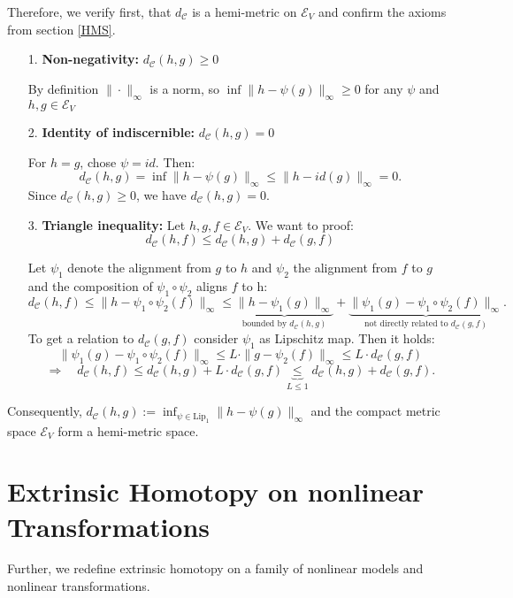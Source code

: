 Therefore, we verify first, that $d_\mathcal{C}$ is a hemi-metric on $\mathcal{E}_V$ and confirm the axioms from section \ref{HMS}.\\
\begin{itemize}
    \item [1.] \textbf{Non-negativity:} $d_\mathcal{C}(h,g)\geq 0$
    \item [] By definition $\|\cdot\|_\infty$ is a norm, so $\inf\|h-\psi(g)\|_\infty\geq0$ for any $\psi$ and $h,g\in \mathcal{E}_V$
    \item [2.] \textbf{Identity of indiscernible:} $d_\mathcal{C}(h,g)= 0$
    \item [] For $h=g$, chose $\psi=id$. Then:\[
    d_\mathcal{C}(h,g) = \inf\|h-\psi(g)\|_\infty\leq\|h-id(g)\|_\infty = 0.
    \]
    Since $d_\mathcal{C}(h,g)\geq 0$, we have $d_\mathcal{C}(h,g) = 0$.
    \item [3.] \textbf{Triangle inequality:} Let $h,g,f\in\mathcal{E}_V$.
    We want to proof:
    \[d_\mathcal{C}(h,f) \leq d_\mathcal{C}(h,g)+d_\mathcal{C}(g,f)\]
    \item [] Let $\psi_1$ denote the alignment from $g$ to $h$ and $\psi_2$ the alignment from $f$ to $g$ and the composition of $\psi_1\circ \psi_2$ aligns $f$ to h:
    \[
        d_\mathcal{C}(h,f)\leq \|h-\psi_1\circ \psi_2(f)\|_\infty\leq \underbrace{\|h-\psi_1(g)\|_\infty}_\text{bounded by $d_\mathcal{C}(h,g)$} +\underbrace{\|\psi_1(g)-\psi_1\circ\psi_2(f)\|_\infty}_\text{not directly related to $d_\mathcal{C}(g,f)$}.
    \]
       To get a relation to $d_\mathcal{C}(g,f)$ consider $\psi_1$ as Lipschitz map.
    Then it holds:
    \[\|\psi_1(g)-\psi_1\circ\psi_2(f)\|_\infty \leq L \cdot\|g-\psi_2(f)\|_\infty\leq L\cdot d_\mathcal{C}(g,f)\]
    \[\Longrightarrow \quad  d_\mathcal{C}(h,f)\leq  d_\mathcal{C}(h,g) + L\cdot d_\mathcal{C}(g,f) \underbrace{\leq}_{L \leq 1}  d_\mathcal{C}(h,g) +  d_\mathcal{C}(g,f).\]
\end{itemize}

Consequently, $d_\mathcal{C}(h,g) := \inf_{\psi\in\text{Lip}_1}\|h-\psi(g)\|_\infty$ and the compact metric space $\mathcal{E}_V$ form a hemi-metric space. 


\section{Extrinsic Homotopy on nonlinear Transformations}

Further, we redefine extrinsic homotopy on a family of nonlinear models and nonlinear transformations.
    
